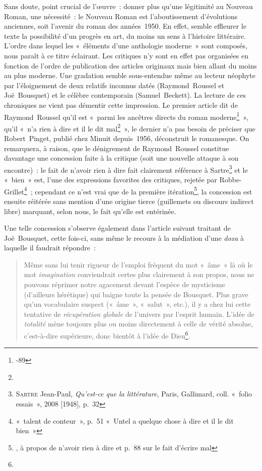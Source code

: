 Sans doute, point crucial de l'œuvre~: donner plus qu'une légitimité au Nouveau Roman, une nécessité~: le Nouveau Roman est l'aboutissement d'évolutions anciennes, soit l'avenir du roman des années~1950. En effet, semble effleurer le texte la possibilité d'un progrès en art, du moins un sens à l'histoire littéraire.
L'ordre dans lequel les «~éléments d'une anthologie moderne~» sont composés, nous paraît à ce titre éclairant. Les critiques n'y sont en effet pas organisées en fonction de l'ordre de publication des articles originaux mais bien allant du moins au plus moderne. Une gradation semble sous-entendue même au lecteur néophyte par l'éloignement de deux relatifs inconnus datés (Raymond~Roussel et Joë~Bousquet) et le célèbre contemporain (Samuel~Beckett). La lecture de ces chroniques ne vient pas démentir cette impression. Le premier article dit de Raymond~Roussel qu'il est «~parmi les ancêtres directs du roman moderne\footnote{-89}~», qu'il «~n’a rien à dire et il le dit mal\footnote{}~», le dernier n'a pas besoin de préciser que Robert~Pinget, publié chez Minuit depuis~1956, déconstruit le romanesque. On remarquera, à raison, que le dénigrement de Raymond~Roussel constitue davantage une concession faite à la critique (soit une nouvelle attaque à son encontre)~: le fait de n'avoir rien à dire fait clairement référence à Sartre\footnote{\textsc{Sartre} Jean-Paul, \textit{Qu'est-ce que la littérature}, Paris, Gallimard, coll. «~folio essais~», 2008 [1948], p.~32} et le «~bien~» est, l'une des expressions favorites des critiques, rejetée par Robbe-Grillet\footnote{ «~talent de conteur~», p.~51 «~Untel a quelque chose à dire et il le dit bien~»}~; cependant ce n'est vrai que de la première itération\footnote{, à propos de n'avoir rien à dire et p.~88 sur le fait d'écrire mal}, la concession est ensuite réitérée sans mention d'une origine tierce (guillemets ou discours indirect libre) marquant, selon nous, le fait qu'elle est entérinée.

Une telle concession s'observe également dans l'article suivant traitant de Joë~Bousquet, cette fois-ci, sans même le recours à la médiation d'une \textit{doxa} à laquelle il faudrait répondre~:
\begin{quote}
    Même sans lui tenir rigueur de l’emploi fréquent du mot «~âme~» là où le mot \textit{imagination} conviendrait certes plus clairement à son propos, nous ne pouvons réprimer notre agacement devant l’espèce de mysticisme (d’ailleurs hérétique) qui baigne toute la pensée de Bousquet. Plus grave qu’un vocabulaire suspect («~âme~», «~salut~», etc.), il y a chez lui cette tentative de \textit{récupération} \textit{globale} de l’univers par l’esprit humain. L’idée de \textit{totalité} mène toujours plus ou moins directement à celle de vérité absolue, c’est-à-dire supérieure, donc bientôt à l’idée de Dieu\footnote{}.
\end{quote}

